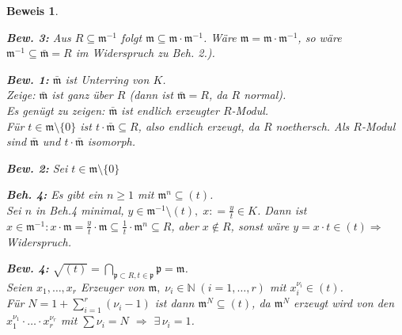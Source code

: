 \documentclass[a4paper,12pt]{scrbook}
\theoremstyle{break}
\theoremstyle{nonumberbreak}
\newtheorem{Bew}{Beweis}
\theoremstyle{nonumberplain}
\newcommand{\defeqr}[0]{\mathrel{\mathop:}=}
\begin{document}
\begin{Bew}
\begin{description}
\textbf{Bew. 3:} Aus $R \subseteq \mathfrak{m}^{-1}$ folgt $\mathfrak{m}
\subseteq \mathfrak{m} \cdot \mathfrak{m}^{-1}$. Wäre $\mathfrak{m} =
\mathfrak{m} \cdot \mathfrak{m}^{-1}$, so wäre $\mathfrak{m}^{-1} \subseteq
\bar{\mathfrak{m}} = R$ im Widerspruch zu Beh. 2.).

\textbf{Bew. 1:} $\bar{\mathfrak{m}}$ ist Unterring von $K$.\\
Zeige: $\bar{\mathfrak{m}}$ ist ganz über $R$ (dann ist $\bar{\mathfrak{m}} =
R$, da $R$ normal).\\
Es genügt zu zeigen: $\bar{\mathfrak{m}}$ ist endlich erzeugter $R$-Modul.\\
Für $t \in \mathfrak{m} \setminus \{0\}$ ist $t \cdot \bar{\mathfrak{m}}
\subseteq R$, also endlich erzeugt, da $R$ noethersch.
Als $R$-Modul sind $\bar{\mathfrak{m}}$ und $t \cdot \bar{\mathfrak{m}}$
isomorph.

\textbf{Bew. 2:} Sei $t \in \mathfrak{m} \setminus\{0\}$

\textbf{Beh. 4:} Es gibt ein $n \geq 1$ mit $\mathfrak{m}^n \subseteq (t)$.\\
Sei $n$ in Beh.4 minimal, $y \in \mathfrak{m}^{-1} \setminus (t), \; x \defeqr
\frac{y}{t} \in K$.
Dann ist $x \in \mathfrak{m}^{-1}: x \cdot \mathfrak{m} = \frac{y}{t} \cdot
\mathfrak{m} \subseteq \frac{1}{t} \cdot \mathfrak{m}^n \subseteq R$, aber $x
\not\in R$, sonst wäre $y = x \cdot t \in (t) \Rightarrow$ Widerspruch.

\textbf{Bew. 4:} $\sqrt{(t)} = \bigcap_{\mathfrak{p} \subset R, t \in
\mathfrak{p}} \mathfrak{p} = \mathfrak{m}$.\\
Seien $x_1, \dots, x_r$ Erzeuger von $\mathfrak{m}, \; \nu_i \in \mathbb{N}
\;(i=1, \dots,r)$ mit $x_i^{\nu_i} \in (t)$.\\
Für $N = 1 + \sum_{i =1}^r(\nu_i -1)$ ist dann $\mathfrak{m}^N \subseteq (t)$,
da $\mathfrak{m}^N$ erzeugt wird von den $x_1^{\nu_1} \cdot \ldots \cdot
x_r^{\nu_r}$ mit $\sum \nu_i = N$ $\Rightarrow$ $\exists\, \nu_i = 1$.
\end{description}
\end{Bew}
\end{document}
